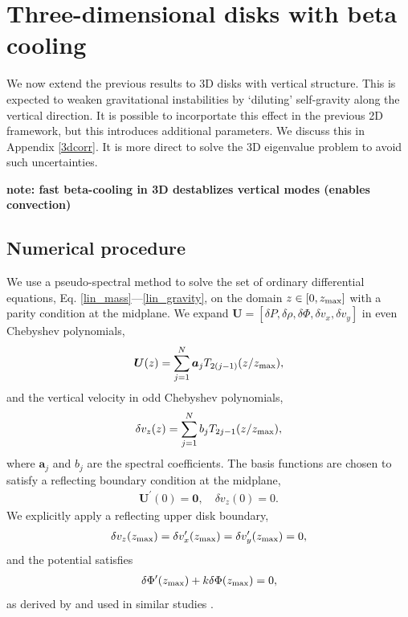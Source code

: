 \section{Three-dimensional disks with beta cooling}\label{3ddisk}
We now extend the previous results to 3D disks with vertical
structure. This is expected to weaken gravitational instabilities by
`diluting' self-gravity along the vertical direction. It is possible to incorportate
this effect in the previous 2D framework, but this introduces
additional parameters. We discuss this in Appendix \ref{3dcorr}. 
It is more direct to solve the 3D eigenvalue problem to avoid such 
uncertainties.  

{\bf note: fast beta-cooling in 3D destablizes vertical modes (enables
convection)}

\subsection{Numerical procedure}
We use a pseudo-spectral method to solve the set of ordinary
differential equations, Eq. \ref{lin_mass}---\ref{lin_gravity}, on 
the domain $ z\in[0,z_\mathrm{max}]$ with a parity condition at the midplane.
We expand $\bm{U}=[\delta P,\delta\rho,\delta\Phi,
  \delta v_x, \delta 
  v_y]$ in even Chebyshev polynomials,
\begin{align}
  \bm{U}(z) = \sum_{j=1}^N \bm{a}_jT_{2(j-1)}(z/z_\mathrm{max}), 
\end{align}
and the vertical velocity in odd Chebyshev polynomials,
\begin{align}
  \delta v_z(z) = \sum_{j=1}^N b_jT_{2j-1}(z/z_\mathrm{max}),   
\end{align}
where $\bm{a}_j$ and $b_j$ are the spectral coefficients. 
The basis functions are chosen to satisfy a reflecting boundary
condition at the midplane, %
\begin{align}
  \bm{U}^\prime(0) = \bm{0}, \quad \delta v_z(0) = 0.
\end{align}
We explicitly apply a reflecting upper disk boundary, 
\begin{align}
  \delta v_z(z_\mathrm{max}) = \delta v_x^\prime(z_\mathrm{max}) = \delta
  v_y^\prime(z_\mathrm{max}) = 0,
\end{align}
and the potential satisfies
\begin{align}
  \delta \Phi^\prime (z_\mathrm{max}) + k \delta\Phi(z_\mathrm{max}) = 0, 
\end{align}
as derived by \cite{goldreich65a} and used in similar studies  
\citep{kim12,lin14c}. %

